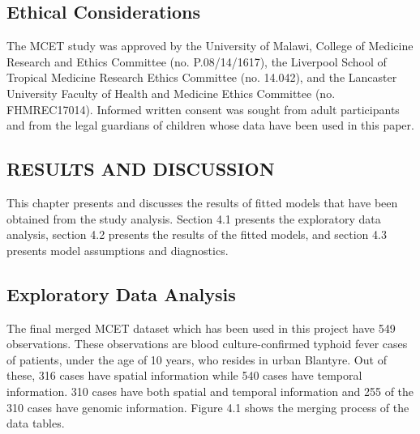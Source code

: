 \documentclass[12pt,a4paper]{report}
\begin{document}
\section{Ethical Considerations}

The MCET study was approved by the University of Malawi, College of
Medicine Research and Ethics Committee (no. P.08/14/1617), the Liverpool School of Tropical Medicine Research Ethics Committee (no. 14.042), and the Lancaster University Faculty of Health and Medicine Ethics Committee (no. FHMREC17014). Informed written consent was sought
from adult participants and from the legal guardians of children whose data have been used in this paper.

\begin{center}
\chapter{RESULTS AND DISCUSSION}
\end{center} 

This chapter presents and discusses the results of fitted models that have been obtained from the study analysis. Section 4.1 presents the exploratory data analysis, section 4.2 presents the results of the fitted models, and section 4.3 presents model assumptions and diagnostics.

\section{Exploratory Data Analysis}

The final merged MCET dataset which has been used in this project have 549 observations. These observations are blood culture-confirmed typhoid fever cases of patients, under the age of 10 years, who resides in urban Blantyre. Out of these, 316 cases have spatial information while 540 cases have temporal information. 310 cases have both spatial and temporal information and 255 of the 310 cases have genomic information. Figure 4.1 shows the merging process of the data tables.\\
\end{document}
